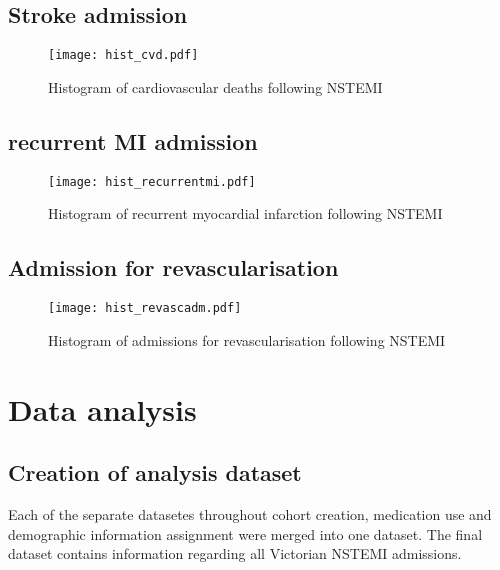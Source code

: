 \documentclass[11pt]{article}
\begin{document}
\subsection{Stroke admission}
\color{violet}
\begin{stlog}\end{stlog}
\color{black}
\begin{figure} [h]
	\centering
	\texttt{[image: hist\_cvd.pdf]}
	\caption{Histogram of cardiovascular deaths following NSTEMI}
	\label{hist_cvd}
\end{figure}
\color{violet}
\begin{stlog}\end{stlog}
\color{black}
\subsection{recurrent MI admission}
\color{violet}
\begin{stlog}\end{stlog}
\color{black}
\begin{figure} [h]
	\centering
	\texttt{[image: hist\_recurrentmi.pdf]}
	\caption{Histogram of recurrent myocardial infarction following NSTEMI}
	\label{hist_recurrentmi}
\end{figure}

\subsection{Admission for revascularisation}
\color{black}
\begin{stlog}\end{stlog}
\color{black}
\begin{figure} [h]
	\centering
	\texttt{[image: hist\_revascadm.pdf]}
	\caption{Histogram of admissions for revascularisation following NSTEMI}
	\label{hist_revascadm}
\end{figure}

\pagebreak
\section{Data analysis}
\subsection{Creation of analysis dataset}
Each of the separate datasetes throughout cohort creation, medication use and demographic information assignment were merged into one dataset. The final dataset contains information regarding all Victorian NSTEMI admissions.
\color{violet}
\begin{stlog}\end{stlog}
\color{black}
\pagebreak
\end{document}
